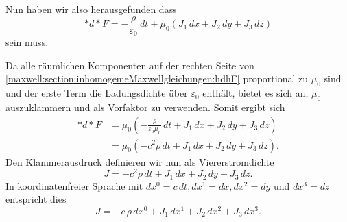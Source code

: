 Nun haben wir also herausgefunden dass
\begin{equation}
	\ast d {\ast} F = -\frac{\rho}{\varepsilon_0}\,dt + \mu_0 (J_1 \,dx +  J_2 \,dy +  J_3 \,dz)
	\label{maxwell:section:inhomogemeMaxwellgleichungen:hdhF}
\end{equation}
sein muss.

Da alle räumlichen Komponenten auf der rechten Seite von \eqref{maxwell:section:inhomogemeMaxwellgleichungen:hdhF} proportional zu $\mu_0$ sind und der erste Term die Ladungsdichte über $\varepsilon_0$ enthält, bietet es sich an, $\mu_0$ auszuklammern und als Vorfaktor zu verwenden.
Somit ergibt sich
\begin{align*}
	\ast d {\ast} F
	& = \mu_0 \left( -\frac{\rho}{\varepsilon_0 \mu_0}\,dt + J_1\, dx + J_2\, dy + J_3\, dz \right)\\[2ex]
	& = \mu_0 \left( -c^2 \rho \,dt + J_1 \,dx + J_2 \,dy + J_3 \,dz \right).
\end{align*}
Den Klammerausdruck definieren wir nun als Viererstromdichte
\begin{equation}
	J = -c^2 \rho\, dt + J_1 \,dx + J_2 \,dy + J_3 \,dz.
\end{equation}
In koordinatenfreier Sprache mit $dx^0 = c\,dt, dx^1 = dx,dx^2=dy$ und $dx^3 = dz$ entspricht dies
\begin{equation}
	J = -c\,\rho\,dx^0 + J_1 \,dx^1 + J_2 \,dx^2 + J_3 \,dx^3.
\end{equation}


